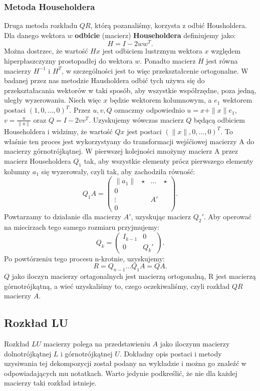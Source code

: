 \subsubsection{Metoda Householdera}
Druga metoda rozkładu $QR$, którą pozanaliśmy, korzysta z odbić Housholdera.
Dla danego wektora $w$ \textbf{odbicie} (macierz) \textbf{Householdera}
definiujemy jako:
$$H=I-2ww^T.$$
Można dostrzec, że wartość $Hx$ jest odbiciem lustrznym wektora $x$ względem
hiperpłaszczyzny prostopadłej do wektora $w$. Ponadto macierz $H$ jest równa
macierzy $H^{-1}$ i $H^T$, w szczególności jest to więc przekształcenie
ortogonalne. W badanej przez nas metodzie Hausholdera odbić tych używa się
do przekształacania wektorów w taki sposób, aby wszystkie współrzędne,
poza jedną, uległy wyzerowaniu. Niech więc $x$ będzie wektorem kolumnowym,
a $e_1$ wektorem postaci $(1,0,...,0)^T$. Przez $u, v, Q$ oznaczmy odpowiednio $u=x+\|x\|e_1$,
$v=\frac{u}{\|u\|}$ oraz $Q=I-2vv^T$. Uzyskujemy wówczas macierz $Q$
będącą odbiciem Householdera i  widzimy, że wartość $Qx$ jest postaci $(\|x\|,0,...,0)^T$.
To właśnie ten proces jest wykorzystyany do transformacji wejśćiowej
macierzy A do macierzy górnotrójkątnej. W pierwszej kolejności mnożymy
macierz A przez macierz Householdera $Q_1$ tak, aby wszystkie elementy
prócz pierwszego elementy kolumny $a_1$ się wyzerowały, czyli tak, aby
zachodziła równość:
$$ Q_1A = \begin{pmatrix} \|a_1\|&\star&\dots&\star\\ 0 & & & \\ \vdots & &
A' & \\ 0 & & & \end{pmatrix}.$$
Powtarzamy to działanie dla macierzy $A'$, uzyskując macierz $Q_2'$.
Aby operować na miecirzach tego samego rozmiaru przyjmujemy:
$$Q_k=\begin{pmatrix} I_{k-1} & 0 \\ 0 & Q_k' \end{pmatrix}.$$
Po powtórzeniu tego procesu n-krotnie, uzyskujemy:
$$R=Q_{n-1}...Q_1A=QA.$$
$Q$ jako iloczyn macierzy ortagonalnych jest macierzą ortogonalną, R jest
macierzą górnotrójkątną, a wieć uzyskaliśmy to, czego oczekiwaliśmy, czyli
rozkład $QR$ macierzy $A$.
\subsection{Rozkład LU}
Rozkład $LU$ macierzy polega na przedstawieniu $A$ jako iloczynu macierzy
dolnotrójkątnej $L$ i górnotrójkątnej $U$. Dokładny opis postaci i metody
uzysiwania tej dekompozycji został podany na wykładzie i można go znaleźć w
odpowiadających mu notatkach. Warto jedynie podkreślić, że nie dla każdej
macierzy taki rozkład istnieje.
